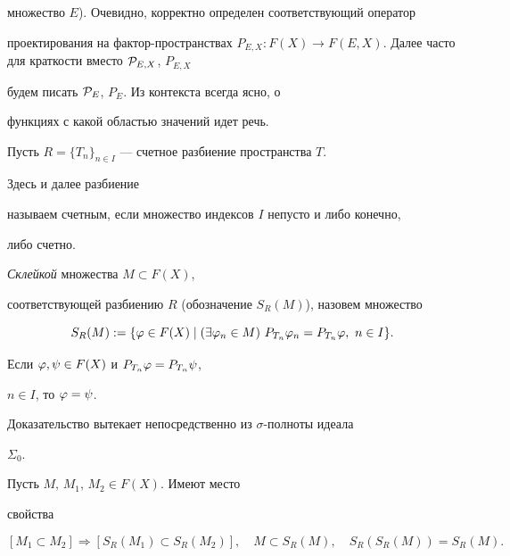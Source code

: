 множество $E$). Очевидно, корректно определен соответствующий оператор


проектирования на фак\-тор-про\-ст\-ран\-ст\-вах $P_{E,X}:F(X)\to


F(E,X)$. Далее часто для краткости вместо ${\cal P}_{E,X}$, $P_{E,X}$


будем писать ${\cal P}_{E}$, $P_{E}$. Из контекста всегда ясно, о


функциях с какой областью значений идет речь.





Пусть $R=\{T_n\}_{n\in I}$ --- счетное разбиение пространства $T$.


Здесь и далее разбиение


называем счетным, если множество индексов $I$ непусто и либо конечно,


либо счетно.





\begin{defn}


{\it Склейкой} множества $M\subset F(X)$,


соответствующей разбиению $R$ (обозначение $S_R(M)$), назовем множество


$$


S_R(M):=\{\f\in F(X)\mid(\exists \f_n\in M) \


P_{T_n}\f_n=P_{T_n}\f, \ n\in I\}.


$$


\end{defn}





\begin{lem}


Если $\varphi,\psi\in F(X)$ и $P_{T_n}\varphi=P_{T_n}\psi$,


$n\in I$, то $\varphi=\psi$.


\end{lem}





Доказательство вытекает непосредственно из $\sigma$-пол\-но\-ты идеала


$\Sigma_0$.





\begin{lem}


Пусть $M,\,M_1,\,M_2\in F(X)$. Имеют место


свойства


$$


[M_1\subset M_2]\Rightarrow[S_R(M_1)\subset S_R(M_2)], \quad


M\subset S_R(M), \quad S_R(S_R(M))=S_R(M).


$$


\end{lem}





